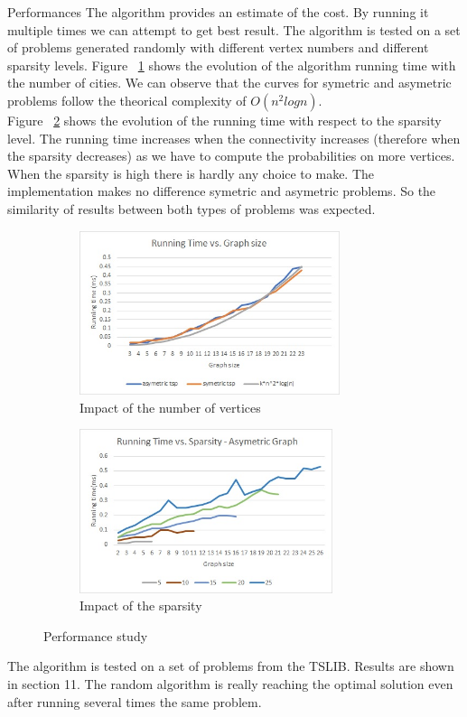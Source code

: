 \documentclass[../report.tex]{subfiles}
\begin{document}
\begin{subsection}{Performances}
The algorithm provides an estimate of the cost. By running it multiple times we can attempt to get best result.
The algorithm is tested on a set of problems generated randomly with different vertex numbers and different sparsity levels.
Figure ~\ref{fig:randomgraphsize} shows the evolution of the algorithm running time with the number of cities. We can observe that the curves for symetric and asymetric problems follow the theorical complexity of $O(n^2 log n)$. \\
Figure ~\ref{fig:randomsparsity} shows the evolution of the running time with respect to the sparsity level. The running time increases when the connectivity increases (therefore when the sparsity decreases) as we have to compute the probabilities on more vertices. When the sparsity is high there is hardly any choice to make.
The implementation makes no difference symetric and asymetric problems. So the similarity of results between both types of problems was expected.

\begin{figure}[H]
\centering
\begin{subfigure}{.5\textwidth}
\includegraphics[height=4.8cm,valign=t]{perf_random_graphsize.jpg}
\caption{Impact of the number of vertices \label{fig:randomgraphsize}}
\end{subfigure}%
\begin{subfigure}{.5\textwidth}
\includegraphics[height=4.8cm,valign=t]{perf_random_sparsity.jpg}
\caption{Impact of the sparsity \label{fig:randomsparsity}}
\end{subfigure}%
\caption{Performance study \label{fig:randomperf}}
\end{figure}

The algorithm is tested on a set of problems from the TSLIB. Results are shown in section 11. The random algorithm is really reaching the optimal solution even after running several times the same problem.


\end{subsection}
\end{document}
